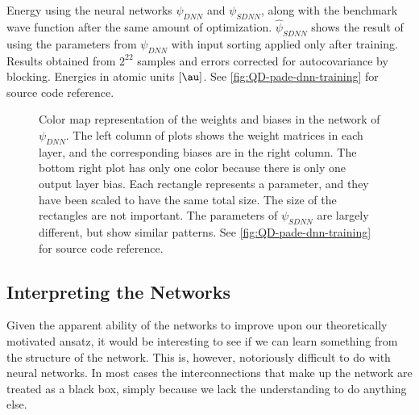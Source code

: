 \documentclass[Thesis.tex]{subfiles}
\begin{document}
\begin{table}[h]
  \centering

  \caption[Energy estimates using a neural network on quantum
  dots]{\label{tab:pade-dnn-energy-results}Energy using the neural networks
$\psi_{DNN}$ and $\psi_{SDNN}$, along with the benchmark wave function after the
same amount of optimization. $\hat\psi_{SDNN}$ shows the result of using the
parameters from $\psi_{DNN}$ with input sorting applied only after training.
Results obtained from $2^{22}$ samples and errors corrected for autocovariance by blocking. Energies in atomic units
$[\si{\au}]$. See \cref{fig:QD-pade-dnn-training} for source code reference.}
  
\end{table}

%         

\begin{figure}[h]
   \centering
    \resizebox{!}{0.35\paperheight}{%
        
    }
    \caption[Weights of a neural network trained on quantum
dots]{\label{fig:QD-pade-dnn-weights}Color map representation of the weights and
biases in the network of $\psi_{DNN}$. The left column of plots shows the weight
matrices in each layer, and the corresponding biases are in the right column.
The bottom right plot has only one color because there is only one output layer
bias. Each rectangle represents a parameter, and they have been scaled to have
the same total size. The size of the rectangles are not important. The
parameters of $\psi_{SDNN}$ are largely different, but show similar patterns.
See \cref{fig:QD-pade-dnn-training} for source code reference.}
\end{figure}

\subsection{Interpreting the Networks}

Given the apparent ability of the networks to improve upon our theoretically
motivated ansatz, it would be interesting to see if we can learn something from
the structure of the network. This is, however, notoriously difficult to do with
neural networks. In most cases the interconnections that make up the network are
treated as a black box, simply because we lack the understanding to do
anything else.
\end{document}
